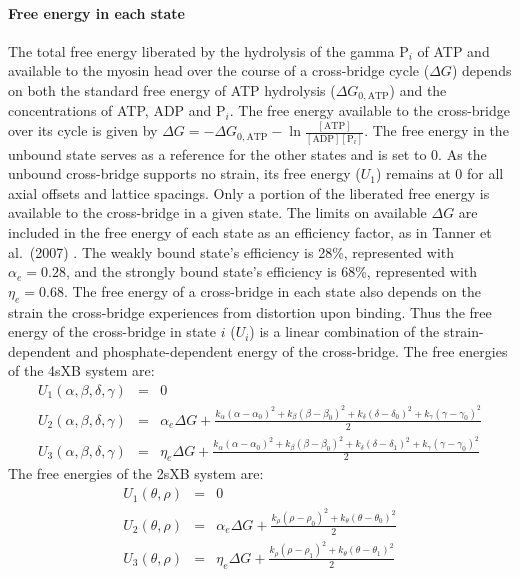 \documentclass[10pt]{article}
\newcommand{\citep}[1]{\cite{#1}} %
\begin{document}
\paragraph{Free energy in each state} %
The total free energy liberated by the hydrolysis of the gamma $\mathrm{P}_i$ of ATP and available to the myosin head over the course of a cross-bridge cycle ($\Delta G$) depends on both the standard free energy of ATP hydrolysis ($\Delta G_{0,\mathrm{ATP}}$) and the concentrations of ATP, ADP and $\mathrm{P}_i$. 
The free energy available to the cross-bridge over its cycle is given by $\Delta G = -\Delta G_{0,\mathrm{ATP}} - \ln \frac{[\mathrm{ATP}]}{[\mathrm{ADP}] [\mathrm{P}_i]}$. 
The free energy in the unbound state serves as a reference for the other states and is set to 0. 
As the unbound cross-bridge supports no strain, its free energy ($U_1$) remains at 0 for all axial offsets and lattice spacings. 
Only a portion of the liberated free energy is available to the cross-bridge in a given state.
The limits on available $\Delta G$ are included in the free energy of each state as an efficiency factor, as in Tanner et al.~(2007) \citep{Pate1989, Tanner2007} .
The weakly bound state's efficiency is 28\%, represented with $\alpha_e=0.28$, and the strongly bound state's efficiency is 68\%, represented with $\eta_e=0.68$. 
The free energy of a cross-bridge in each state also depends on the strain the cross-bridge experiences from distortion upon binding.
Thus the free energy of the cross-bridge in state $i$ ($U_i$) is a linear combination of the strain-dependent and phosphate-dependent energy of the cross-bridge.
The free energies of the 4sXB system are: 
\begin{eqnarray}
\label{eq_4sEnergy}
U_1(\alpha, \beta, \delta, \gamma) & = & 0 \nonumber \\
U_2(\alpha, \beta, \delta, \gamma) & = & \alpha_e \Delta G + \frac{k_\alpha (\alpha-\alpha_0)^2 + k_\beta (\beta-\beta_0)^2 + k_\delta (\delta-\delta_0)^2 + k_\gamma (\gamma-\gamma_0)^2}{2} \\
U_3(\alpha, \beta, \delta, \gamma) & = & \eta_e \Delta G + \frac{k_\alpha (\alpha-\alpha_0)^2 + k_\beta (\beta-\beta_0)^2 + k_\delta (\delta-\delta_1)^2 + k_\gamma (\gamma-\gamma_0)^2}{2} \nonumber
\end{eqnarray}
The free energies of the 2sXB system are: 
\begin{eqnarray}
\label{eq_2sEnergy}
	U_1(\theta, \rho) & = & 0 \nonumber \\
    U_2(\theta, \rho) & = & \alpha_e \Delta G + \frac{k_\rho (\rho - \rho_0)^2 + 
                          k_\theta (\theta - \theta_0)^2}{2} \\
    U_3(\theta, \rho) & = & \eta_e \Delta G   + \frac{k_\rho (\rho - \rho_1)^2 + 
                          k_\theta (\theta - \theta_1)^2}{2} \nonumber 
\end{eqnarray}
\end{document}
